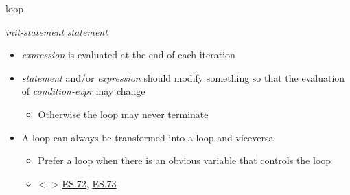 \begin{frame}[fragile]{ loop \insertcontinuationtext}

   \textit{init-statement}  \code{;}
   \code{)} \textit{statement}

  \pause

  \begin{itemize}[<+->]
  \item \textit{expression} is evaluated at the end of each iteration
  \item \textit{statement} and/or \textit{expression} should modify something so
    that the evaluation of \textit{condition-expr} may change
    \begin{itemize}[<.->]
    \item Otherwise the loop may never terminate
    \end{itemize}
  \item A  loop can always be transformed into a  loop and
    viceversa
    \begin{itemize}
    \item Prefer a  loop when there is an obvious variable that
      controls the loop
    \item<.->
      \href{https://isocpp.github.io/CppCoreGuidelines/CppCoreGuidelines#es72-prefer-a-for-statement-to-a-while-statement-when-there-is-an-obvious-loop-variable}{ES.72},
      \href{https://isocpp.github.io/CppCoreGuidelines/CppCoreGuidelines#es73-prefer-a-while-statement-to-a-for-statement-when-there-is-no-obvious-loop-variable}{ES.73}
    \end{itemize}
  \end{itemize}
\end{frame}

